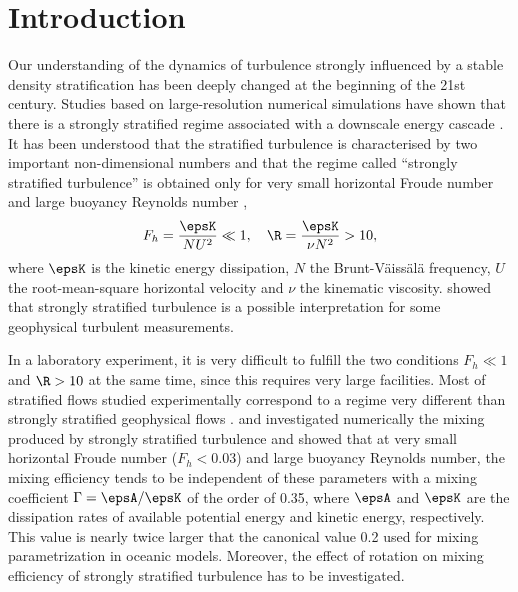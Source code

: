 \section{Introduction} 

\noindent
Our understanding of the dynamics of turbulence strongly influenced by a stable
density stratification has been deeply changed at the beginning of the 21st
century.
%
Studies based on large-resolution numerical simulations have shown that there
is a strongly stratified regime associated with a downscale energy cascade
\citep[]{RileyDeBruynKops2003, Lindborg2006}.
%
It has been understood that the stratified turbulence is characterised by two
important non-dimensional numbers and that the regime called ``strongly
stratified turbulence'' is obtained only for very small horizontal Froude
number and large buoyancy Reynolds number \citep[]{Billant2001,
BrethouwerBillantLindborg2007},
\begin{equation}
 F_h = \frac{\epsK}{N U^2} \ll 1,\quad \R = \frac{\epsK}{\nu N^2} > 10,
\label{eq:FhR}
\end{equation}
where $\epsK$ is the kinetic energy dissipation, $N$ the
Brunt-V\"{a}iss\"{a}l\"{a} frequency, $U$ the root-mean-square horizontal
velocity and $\nu$ the kinematic viscosity.
%
\cite{RileyLindborg2008} showed that strongly stratified turbulence is a
possible interpretation for some geophysical turbulent measurements.

\noindent In a laboratory experiment, it is very difficult to fulfill the two conditions $F_h \ll 1$ and $\R > 10$ at the same time, since this requires very large
facilities.
%
Most of stratified flows studied experimentally
correspond to a regime very different than strongly stratified geophysical
flows \citep[see for example][]{PraudFinchamSommeria2005,
AugierBillantNegrettiChomaz2013, AugierBillantChomaz2015}.
%
\cite{BrethouwerLindborg2009} and \cite{Maffioli2016} investigated numerically
the mixing produced by strongly stratified turbulence and showed that at very
small horizontal Froude number ($F_h < 0.03$) and large buoyancy Reynolds
number, the mixing efficiency tends to be independent of these parameters with
a mixing coefficient $\Gamma = \epsA/\epsK$ of the order of 0.35, where $\epsA$
and $\epsK$ are the dissipation rates of available potential energy and kinetic
energy, respectively. This value is nearly twice larger that the canonical
value 0.2 used for mixing parametrization in oceanic models. Moreover, the
effect of rotation on mixing efficiency of strongly stratified
turbulence has to be investigated.

